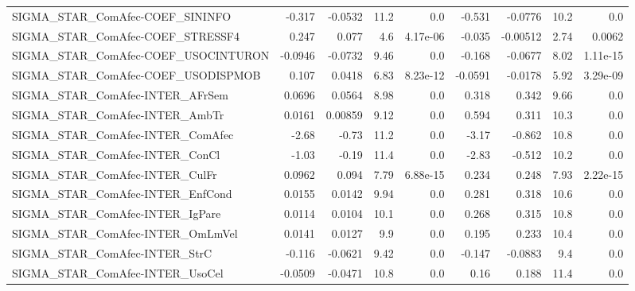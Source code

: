 \begin{tabular}{lrrrrrrrr}
SIGMA\_STAR\_ComAfec-COEF\_SININFO        &      -0.317 &      -0.0532 &    11.2 &      0.0 &     -0.531 &     -0.0776 &         10.2 &           0.0 \\
SIGMA\_STAR\_ComAfec-COEF\_STRESSF4       &       0.247 &        0.077 &     4.6 & 4.17e-06 &     -0.035 &    -0.00512 &         2.74 &        0.0062 \\
SIGMA\_STAR\_ComAfec-COEF\_USOCINTURON    &     -0.0946 &      -0.0732 &    9.46 &      0.0 &     -0.168 &     -0.0677 &         8.02 &      1.11e-15 \\
SIGMA\_STAR\_ComAfec-COEF\_USODISPMOB     &       0.107 &       0.0418 &    6.83 & 8.23e-12 &    -0.0591 &     -0.0178 &         5.92 &      3.29e-09 \\
SIGMA\_STAR\_ComAfec-INTER\_AFrSem        &      0.0696 &       0.0564 &    8.98 &      0.0 &      0.318 &       0.342 &         9.66 &           0.0 \\
SIGMA\_STAR\_ComAfec-INTER\_AmbTr         &      0.0161 &      0.00859 &    9.12 &      0.0 &      0.594 &       0.311 &         10.3 &           0.0 \\
SIGMA\_STAR\_ComAfec-INTER\_ComAfec       &       -2.68 &        -0.73 &    11.2 &      0.0 &      -3.17 &      -0.862 &         10.8 &           0.0 \\
SIGMA\_STAR\_ComAfec-INTER\_ConCl         &       -1.03 &        -0.19 &    11.4 &      0.0 &      -2.83 &      -0.512 &         10.2 &           0.0 \\
SIGMA\_STAR\_ComAfec-INTER\_CulFr         &      0.0962 &        0.094 &    7.79 & 6.88e-15 &      0.234 &       0.248 &         7.93 &      2.22e-15 \\
SIGMA\_STAR\_ComAfec-INTER\_EnfCond       &      0.0155 &       0.0142 &    9.94 &      0.0 &      0.281 &       0.318 &         10.6 &           0.0 \\
SIGMA\_STAR\_ComAfec-INTER\_IgPare        &      0.0114 &       0.0104 &    10.1 &      0.0 &      0.268 &       0.315 &         10.8 &           0.0 \\
SIGMA\_STAR\_ComAfec-INTER\_OmLmVel       &      0.0141 &       0.0127 &     9.9 &      0.0 &      0.195 &       0.233 &         10.4 &           0.0 \\
SIGMA\_STAR\_ComAfec-INTER\_StrC          &      -0.116 &      -0.0621 &    9.42 &      0.0 &     -0.147 &     -0.0883 &          9.4 &           0.0 \\
SIGMA\_STAR\_ComAfec-INTER\_UsoCel        &     -0.0509 &      -0.0471 &    10.8 &      0.0 &       0.16 &       0.188 &         11.4 &           0.0 \\

\end{tabular}
